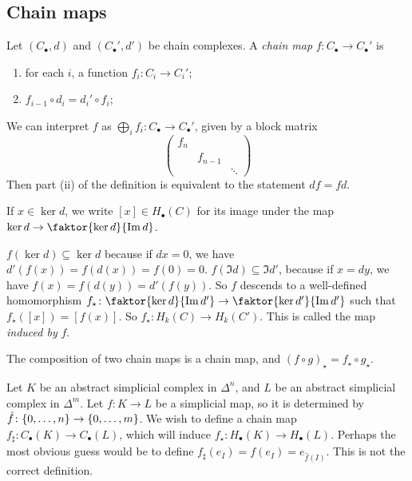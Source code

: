 \subsection{Chain maps}
\begin{definition}
	Let \( (C_\bullet, d) \) and \( (C_\bullet', d') \) be chain complexes.
	A \emph{chain map} \( f \colon C_\bullet \to C_\bullet' \) is
	\begin{enumerate}
		\item for each \( i \), a function \( f_i \colon C_i \to C_i' \);
		\item \( f_{i-1} \circ d_i = d_i' \circ f_i \);
	\end{enumerate}
\end{definition}
\begin{remark}
	We can interpret \( f \) as \( \bigoplus_i f_i \colon C_\bullet \to C_\bullet' \), given by a block matrix
	\[ \begin{pmatrix}
		f_n \\
		& f_{n-1} \\
		& & \ddots
	\end{pmatrix} \]
	Then part (ii) of the definition is equivalent to the statement \( d f = f d \).
\end{remark}
If \( x \in \ker d \), we write \( [x] \in H_\bullet(C) \) for its image under the map \( \ker d \to \faktor{\ker d}{\Im d} \).
\begin{remark}
	\( f(\ker d) \subseteq \ker d \) because if \( dx = 0 \), we have \( d'(f(x)) = f(d(x)) = f(0) = 0 \).
	\( f(\Im d) \subseteq \Im d' \), because if \( x = dy \), we have \( f(x) = f(d(y)) = d'(f(y)) \).
	So \( f \) descends to a well-defined homomorphism \( f_\star \colon \faktor{\ker d}{\Im d'} \to \faktor{\ker d'}{\Im d'} \) such that \( f_\star([x]) = [f(x)] \).
	So \( f_\star \colon H_k(C) \to H_k(C') \).
	This is called the map \emph{induced by} \( f \).
\end{remark}
\begin{remark}
	The composition of two chain maps is a chain map, and \( (f \circ g)_\star = f_\star \circ g_\star \).
\end{remark}
Let \( K \) be an abstract simplicial complex in \( \Delta^n \), and \( L \) be an abstract simplicial complex in \( \Delta^m \).
Let \( f \colon K \to L \) be a simplicial map, so it is determined by \( \hat f \colon \qty{0, \dots, n} \to \qty{0, \dots, m} \).
We wish to define a chain map \( f_\sharp \colon C_\bullet(K) \to C_\bullet(L) \), which will induce \( f_\star \colon H_\bullet(K) \to H_\bullet(L) \).
Perhaps the most obvious guess would be to define \( f_\sharp(e_I) = f(e_I) = e_{\hat f(I)} \).
This is not the correct definition.

